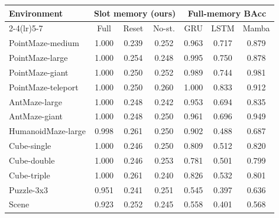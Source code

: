 \begin{tabular}{lcccccc}
\toprule
\multirow{2}{*}{Environment} & \multicolumn{3}{c}{Slot memory (ours)} & \multicolumn{3}{c}{Full-memory BAcc}\\
\cmidrule(lr){2-4}\cmidrule(lr){5-7}
 & Full & Reset & No-st. & GRU & LSTM & Mamba\\
\midrule
PointMaze-medium & 1.000 & 0.239 & 0.252 & 0.963 & 0.717 & 0.879\\
PointMaze-large & 1.000 & 0.254 & 0.248 & 0.995 & 0.750 & 0.878\\
PointMaze-giant & 1.000 & 0.250 & 0.252 & 0.989 & 0.744 & 0.981\\
PointMaze-teleport & 1.000 & 0.250 & 0.260 & 1.000 & 0.833 & 0.912\\
AntMaze-large & 1.000 & 0.248 & 0.242 & 0.953 & 0.694 & 0.835\\
AntMaze-giant & 1.000 & 0.248 & 0.250 & 0.961 & 0.696 & 0.949\\
HumanoidMaze-large & 0.998 & 0.261 & 0.250 & 0.902 & 0.488 & 0.687\\
Cube-single & 1.000 & 0.246 & 0.250 & 0.809 & 0.512 & 0.820\\
Cube-double & 1.000 & 0.246 & 0.253 & 0.781 & 0.501 & 0.799\\
Cube-triple & 1.000 & 0.261 & 0.240 & 0.826 & 0.532 & 0.801\\
Puzzle-3x3 & 0.951 & 0.241 & 0.251 & 0.545 & 0.397 & 0.636\\
Scene & 0.923 & 0.252 & 0.245 & 0.558 & 0.401 & 0.568\\
\bottomrule
\end{tabular}
